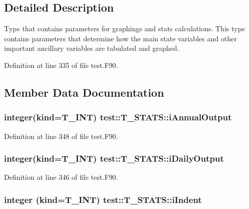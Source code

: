 \subsection{Detailed Description}
Type that contains parameters for graphings and stats calculations. This type contains parameters that determine how the main state variables and other important ancillary variables are tabulated and graphed. 

Definition at line 335 of file test.F90.



\subsection{Member Data Documentation}
\hypertarget{typetest_1_1_t___s_t_a_t_s_a2db35d4a8411e1128e29c279a71e02cf}{
\subsubsection[{iAnnualOutput}]{\setlength{\rightskip}{0pt plus 5cm}integer(kind={\bf T\_\-INT}) {\bf test::T\_\-STATS::iAnnualOutput}}}
\label{typetest_1_1_t___s_t_a_t_s_a2db35d4a8411e1128e29c279a71e02cf}


Definition at line 348 of file test.F90.

\hypertarget{typetest_1_1_t___s_t_a_t_s_af6eab086c9edfda0f600c8380bb90a95}{
\subsubsection[{iDailyOutput}]{\setlength{\rightskip}{0pt plus 5cm}integer(kind={\bf T\_\-INT}) {\bf test::T\_\-STATS::iDailyOutput}}}
\label{typetest_1_1_t___s_t_a_t_s_af6eab086c9edfda0f600c8380bb90a95}


Definition at line 346 of file test.F90.

\hypertarget{typetest_1_1_t___s_t_a_t_s_a2b4462683c8bfced1f0970228541a23d}{
\subsubsection[{iIndent}]{\setlength{\rightskip}{0pt plus 5cm}integer (kind={\bf T\_\-INT}) {\bf test::T\_\-STATS::iIndent}}}
\label{typetest_1_1_t___s_t_a_t_s_a2b4462683c8bfced1f0970228541a23d}



